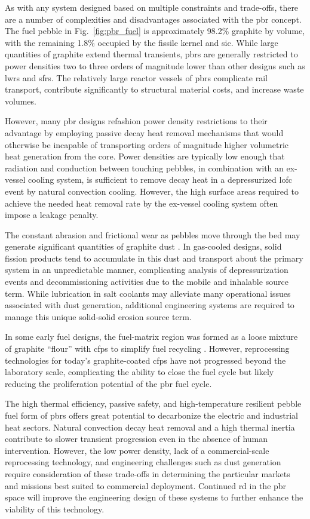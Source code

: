 As with any system designed based on multiple constraints and trade-offs, there are a number of complexities and disadvantages associated with the \gls{pbr} concept. The fuel pebble in Fig.\ \ref{fig:pbr_fuel} is approximately 98.2\% graphite by volume, with the remaining 1.8\% occupied by the fissile kernel and \gls{sic}. While large quantities of graphite extend thermal transients, \glspl{pbr} are generally restricted to power densities two to three orders of magnitude lower than other designs such as \glspl{lwr} and \glspl{sfr}. The relatively large reactor vessels of \glspl{pbr} complicate rail transport, contribute significantly to structural material costs, and increase waste volumes.

However, many \gls{pbr} designs refashion power density restrictions to their advantage by employing passive decay heat removal mechanisms that would otherwise be incapable of transporting orders of magnitude higher volumetric heat generation from the core. Power densities are typically low enough that radiation and conduction between touching pebbles, in combination with an ex-vessel cooling system, is sufficient to remove decay heat in a depressurized \gls{lofc} event by natural convection cooling. However, the high surface areas required to achieve the needed heat removal rate by the ex-vessel cooling system often impose a leakage penalty.

The constant abrasion and frictional wear as pebbles move through the bed may generate significant quantities of graphite dust \cite{hecker,moormann}. In gas-cooled designs, solid fission products tend to accumulate in this dust and transport about the primary system in an unpredictable manner, complicating analysis of depressurization events and decommissioning activities due to the mobile and inhalable source term. While lubrication in salt coolants may alleviate many operational issues associated with dust generation, additional engineering systems are required to manage this unique solid-solid erosion source term.

In some early fuel designs, the fuel-matrix region was formed as a loose mixture of graphite ``flour'' with \glspl{cfp} to simplify fuel recycling \cite{claxton, hecker}. However, reprocessing technologies for today's graphite-coated \glspl{cfp} have not progressed beyond the laboratory scale, complicating the ability to close the fuel cycle \cite{moses} but likely reducing the proliferation potential of the \gls{pbr} fuel cycle.

The high thermal efficiency, passive safety, and high-temperature resilient pebble fuel form of \glspl{pbr} offers great potential to decarbonize the electric and industrial heat sectors. Natural convection decay heat removal and a high thermal inertia contribute to slower transient progression even in the absence of human intervention. However, the low power density, lack of a commercial-scale reprocessing technology, and engineering challenges such as dust generation require consideration of these trade-offs in determining the particular markets and missions best suited to commercial deployment. Continued \gls{rd} in the \gls{pbr} space will improve the engineering design of these systems to further enhance the viability of this technology.

